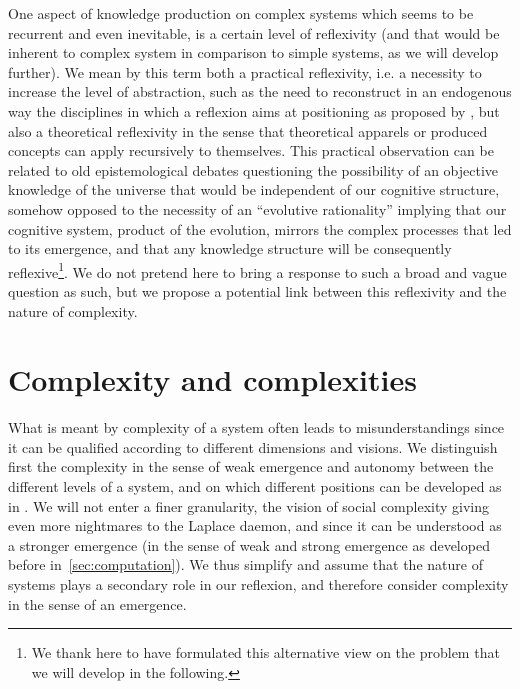 One aspect of knowledge production on complex systems which seems to be recurrent and even inevitable, is a certain level of reflexivity (and that would be inherent to complex system in comparison to simple systems, as we will develop further). We mean by this term both a practical reflexivity, i.e. a necessity to increase the level of abstraction, such as the need to reconstruct in an endogenous way the disciplines in which a reflexion aims at positioning as proposed by \cite{2017arXiv171200805R}%
, but also a theoretical reflexivity in the sense that theoretical apparels or produced concepts can apply recursively to themselves. This practical observation can be related to old epistemological debates questioning the possibility of an objective knowledge of the universe that would be independent of our cognitive structure, somehow opposed to the necessity of an ``evolutive rationality'' implying that our cognitive system, product of the evolution, mirrors the complex processes that led to its emergence, and that any knowledge structure will be consequently reflexive\footnote{We thank here  to have formulated this alternative view on the problem that we will develop in the following.}. We do not pretend here to bring a response to such a broad and vague question as such, but we propose a potential link between this reflexivity and the nature of complexity. 


\section{Complexity and complexities}


What is meant by complexity of a system often leads to misunderstandings since it can be qualified according to different dimensions and visions. We distinguish first the complexity in the sense of weak emergence and autonomy between the different levels of a system, and on which different positions can be developed as in \cite{deffuant2015visions}. We will not enter a finer granularity, the vision of social complexity giving even more nightmares to the Laplace daemon, and since it can be understood as a stronger emergence (in the sense of weak and strong emergence as developed before in~\ref{sec:computation}). We thus simplify and assume that the nature of systems plays a secondary role in our reflexion, and therefore consider complexity in the sense of an emergence.


